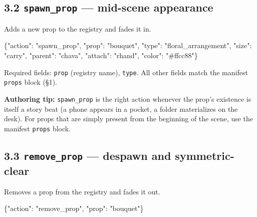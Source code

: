 \documentclass[
  11pt,
]{book}
\newenvironment{Shaded}{}{}
\newcommand{\DataTypeTok}[1]{\textcolor[rgb]{0.56,0.13,0.00}{#1}}
\newcommand{\FunctionTok}[1]{\textcolor[rgb]{0.02,0.16,0.49}{#1}}
\newcommand{\StringTok}[1]{\textcolor[rgb]{0.25,0.44,0.63}{#1}}
\begin{document}
\subsection{\texorpdfstring{3.2 \texttt{spawn\_prop} --- mid-scene
appearance}{3.2 spawn\_prop --- mid-scene appearance}}\label{spawn_prop-mid-scene-appearance}

Adds a new prop to the registry and fades it in.

\begin{Shaded}
\begin{Highlighting}[]
\FunctionTok{\{}\DataTypeTok{"action"}\FunctionTok{:} \StringTok{"spawn\_prop"}\FunctionTok{,} \DataTypeTok{"prop"}\FunctionTok{:} \StringTok{"bouquet"}\FunctionTok{,}
 \DataTypeTok{"type"}\FunctionTok{:} \StringTok{"floral\_arrangement"}\FunctionTok{,} \DataTypeTok{"size"}\FunctionTok{:} \StringTok{"carry"}\FunctionTok{,}
 \DataTypeTok{"parent"}\FunctionTok{:} \StringTok{"chava"}\FunctionTok{,} \DataTypeTok{"attach"}\FunctionTok{:} \StringTok{"rhand"}\FunctionTok{,}
 \DataTypeTok{"color"}\FunctionTok{:} \StringTok{"\#ffcc88"}\FunctionTok{\}}
\end{Highlighting}
\end{Shaded}

Required fields: \texttt{prop} (registry name), \texttt{type}. All other
fields match the manifest \texttt{props} block (§1).

\textbf{Authoring tip:} \texttt{spawn\_prop} is the right action
whenever the prop's existence is itself a story beat (a phone appears in
a pocket, a folder materializes on the desk). For props that are simply
present from the beginning of the scene, use the manifest \texttt{props}
block.

\subsection{\texorpdfstring{3.3 \texttt{remove\_prop} --- despawn and
symmetric-clear}{3.3 remove\_prop --- despawn and symmetric-clear}}\label{remove_prop-despawn-and-symmetric-clear}

Removes a prop from the registry and fades it out.

\begin{Shaded}
\begin{Highlighting}[]
\FunctionTok{\{}\DataTypeTok{"action"}\FunctionTok{:} \StringTok{"remove\_prop"}\FunctionTok{,} \DataTypeTok{"prop"}\FunctionTok{:} \StringTok{"bouquet"}\FunctionTok{\}}
\end{Highlighting}
\end{Shaded}
\end{document}
